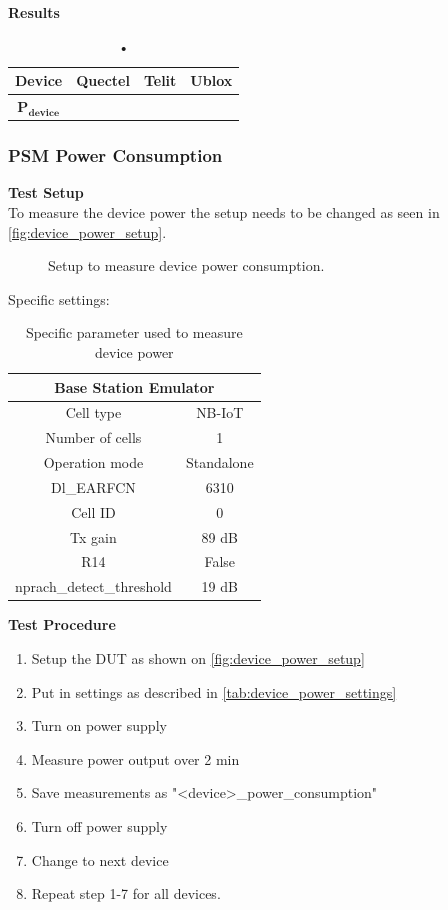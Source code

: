 \textbf{Results}\\
\begin{table}[H]
\centering
\begin{tabular}{|c|c|c|c|}\hline
\textbf{Device}	& Quectel	& Telit & Ublox \\ \hline
$\mathbf{P_{device}}$	& & & \\ \hline
\end{tabular}
\caption{•}
\label{tab:device_power_results}
\end{table}

\subsubsection{\gls{PSM} Power Consumption}
\textbf{Test Setup}\\
To measure the device power the setup needs to be changed as seen in \autoref{fig:device_power_setup}.
\begin{figure}[H]
\centering
{}
\caption{Setup to measure device power consumption.}
\label{fig:device_power_setup}
\end{figure}

Specific settings:
\begin{table}[H]
\centering
\begin{tabular}{|c|c|} \hline
\multicolumn{2}{|c|}{\textbf{Base Station Emulator}} \\ \hline
Cell type          & NB-IoT         \\ \hline
Number of cells    & 1              \\ \hline
Operation mode     & Standalone     \\ \hline
Dl\_EARFCN         & 6310           \\ \hline
Cell ID            & 0              \\ \hline
Tx gain            & 89 dB          \\ \hline
R14                & False          \\ \hline
nprach\_detect\_threshold  & 19 dB  \\ \hline
\end{tabular}
\caption{Specific parameter used to measure device power}
\label{tab:device_power_settings}
\end{table}


\textbf{Test Procedure}\\
\begin{enumerate}
\item Setup the \gls{DUT} as shown on \autoref{fig:device_power_setup}
\item Put in settings as described in \autoref{tab:device_power_settings} 
\item Turn on power supply 
\item Measure power output over 2 min
\item Save measurements as "<device>\_power\_consumption"
\item Turn off power supply
\item Change to next device
\item Repeat step 1-7 for all devices.
\end{enumerate}

